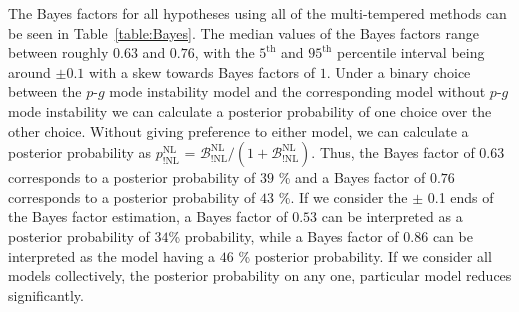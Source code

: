 The Bayes factors for all hypotheses using all of the multi-tempered methods can be seen in Table~\ref{table:Bayes}. The median values of the Bayes factors range between roughly $0.63$ and $0.76$, with the $5^{\mathrm{th}}$ and $95^{\mathrm{th}}$ percentile interval being  around $\pm 0.1$ with a skew towards Bayes factors of $1$. Under a binary choice between the $p$-$g$ mode instability model and the corresponding model without $p$-$g$ mode instability we can calculate a posterior probability of one choice over the other choice. Without giving preference to either model, we can calculate a posterior probability as $p^{\mathrm{NL}}_{\mathrm{!NL}}$ = $\mathcal{B}^{\mathrm{NL}}_{\mathrm{!NL}} / ( 1 + \mathcal{B}^{\mathrm{NL}}_{\mathrm{!NL}})$. Thus, the Bayes factor of $0.63$ corresponds to a posterior probability of $39$ \%  and a Bayes factor of $0.76$ corresponds to a posterior probability of $43$ \%. If we consider the $\pm$ 0.1 ends of the Bayes factor estimation, a Bayes factor of $0.53$ can be interpreted as a posterior probability of $34$\% probability, while a Bayes factor of $0.86$ can be interpreted as the model having a $46$ \% posterior probability. If we consider all models collectively, the posterior probability on any one, particular model reduces significantly.

